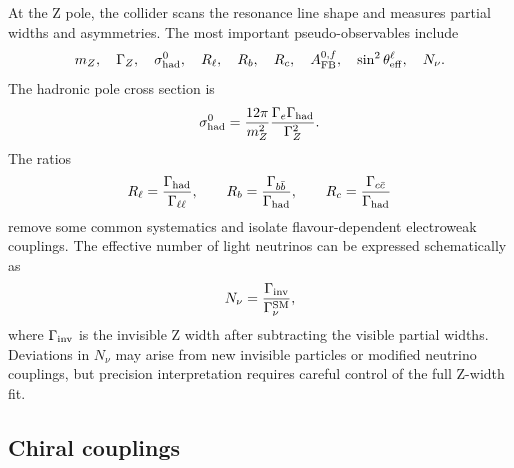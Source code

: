 \documentclass[11pt,a4paper]{report}
\begin{document}
At the Z pole, the collider scans the resonance line shape and measures partial widths and asymmetries.  The most important pseudo-observables include
\begin{equation}
  m_Z,\quad \Gamma_Z,\quad \sigma^0_{\rm had},\quad R_\ell,\quad R_b,\quad R_c,
  \quad A_{\rm FB}^{0,f},\quad \sin^2\theta_{\rm eff}^\ell,\quad N_\nu.
\end{equation}
The hadronic pole cross section is
\begin{equation}
  \sigma^0_{\rm had}=\frac{12\pi}{m_Z^2}\frac{\Gamma_e\Gamma_{\rm had}}{\Gamma_Z^2}.
\end{equation}
The ratios
\begin{equation}
  R_\ell=\frac{\Gamma_{\rm had}}{\Gamma_{\ell\ell}},\qquad
  R_b=\frac{\Gamma_{b\bar b}}{\Gamma_{\rm had}},\qquad
  R_c=\frac{\Gamma_{c\bar c}}{\Gamma_{\rm had}}
\end{equation}
remove some common systematics and isolate flavour-dependent electroweak couplings.  The effective number of light neutrinos can be expressed schematically as
\begin{equation}
  N_\nu=\frac{\Gamma_{\rm inv}}{\Gamma_{\nu}^{\rm SM}},
\end{equation}
where $\Gamma_{\rm inv}$ is the invisible Z width after subtracting the visible partial widths.  Deviations in $N_\nu$ may arise from new invisible particles or modified neutrino couplings, but precision interpretation requires careful control of the full Z-width fit.


\subsection{Chiral couplings}
\end{document}
